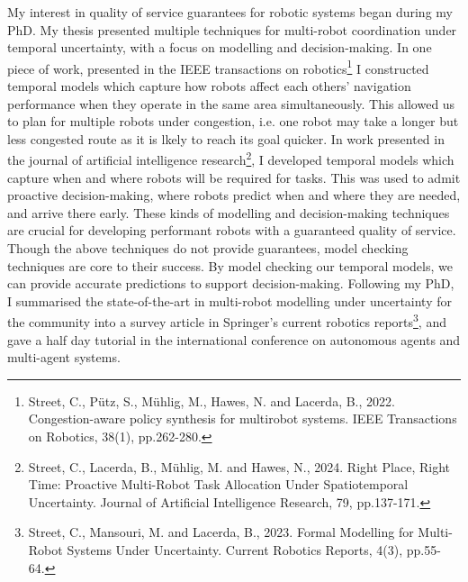 \documentclass[11pt]{article}
\begin{document}
My interest in quality of service guarantees for robotic systems began during my PhD.
%
My thesis presented multiple techniques for multi-robot coordination under temporal uncertainty, with a focus on modelling and decision-making.
%
In one piece of work, presented in the IEEE transactions on robotics\footnote{Street, C., Pütz, S., Mühlig, M., Hawes, N. and Lacerda, B., 2022. Congestion-aware policy synthesis for multirobot systems. IEEE Transactions on Robotics, 38(1), pp.262-280.} I constructed temporal models which capture how robots affect each others' navigation performance when they operate in the same area simultaneously.
%
This allowed us to plan for multiple robots under congestion, i.e. one robot may take a longer but less congested route as it is lkely to reach its goal quicker.
%
In work presented in the journal of artificial intelligence research\footnote{Street, C., Lacerda, B., Mühlig, M. and Hawes, N., 2024. Right Place, Right Time: Proactive Multi-Robot Task Allocation Under Spatiotemporal Uncertainty. Journal of Artificial Intelligence Research, 79, pp.137-171.}, I developed temporal models which capture when and where robots will be required for tasks.
%
This was used to admit proactive decision-making, where robots predict when and where they are needed, and arrive there early.
%
These kinds of modelling and decision-making techniques are crucial for developing performant robots with a guaranteed quality of service.
%
Though the above techniques do not provide guarantees, model checking techniques are core to their success.
%
By model checking our temporal models, we can provide accurate predictions to support decision-making.
%
Following my PhD, I summarised the state-of-the-art in multi-robot modelling under uncertainty for the community into a survey article in Springer's current robotics reports\footnote{Street, C., Mansouri, M. and Lacerda, B., 2023. Formal Modelling for Multi-Robot Systems Under Uncertainty. Current Robotics Reports, 4(3), pp.55-64.}, and gave a half day tutorial in the international conference on autonomous agents and multi-agent systems.

\end{document}
